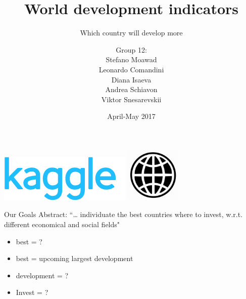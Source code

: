 \documentclass[9pt]{beamer}
\title[World development indicators]{\huge World development indicators}
\subtitle[Which country will develop more]{\large Which country will develop more}
\author[Moawad, Comandini, Isaeva, Schiavon, Snesarevskii] {{\Large Group 12:\\}Stefano Moawad\\Leonardo Comandini\\Diana Isaeva\\Andrea Schiavon\\Viktor Snesarevskii}
\date{April-May 2017}
\begin{document}
	\begin{frame}
	\titlepage
	\vfill
	\begin{flushright}
		\includegraphics[height=.7cm]{kaggle.png}\quad
		\includegraphics[height=.7cm]{worldbank.jpg}
	\end{flushright}
\end{frame}

\begin{frame}{Our Goals} 
Abstract: “… individuate the best countries where to invest, w.r.t. different economical and social fields"
\begin{itemize} [<+->] %
	\item best = ? \\
	\item best = upcoming largest development
	\item development = ?
	\item Invest = ?
\end{itemize}
\end{frame}
\end{document}
